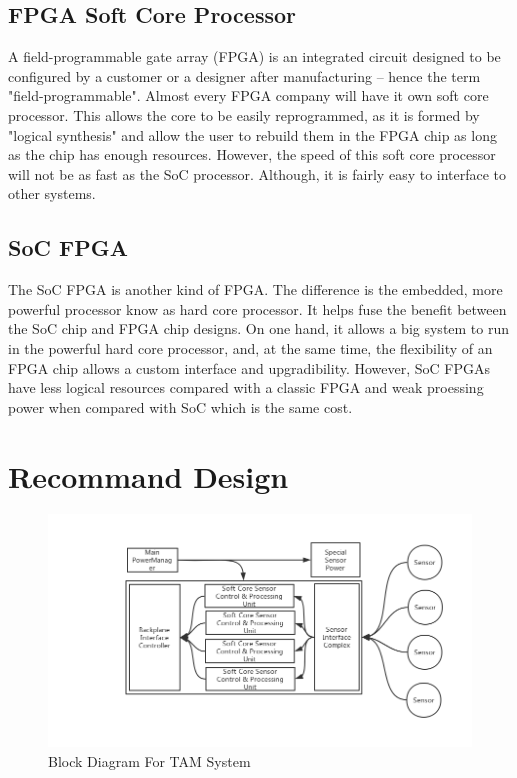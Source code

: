 \documentclass[12pt,article]{memoir}
\begin{document}
\section{FPGA Soft Core Processor}
A field-programmable gate array (FPGA) is an integrated circuit designed to be configured by a customer or a designer after manufacturing – hence the term "field-programmable".\cite{Cite Needed} Almost every FPGA company will have it own soft core processor. This allows the core to be easily reprogrammed, as it is formed by "logical synthesis" and allow the user to rebuild them in the FPGA chip as long as the chip has enough resources. However, the speed of this soft core processor will not be as fast as the SoC processor. Although, it is fairly easy to interface to other systems.\section{SoC FPGA}
The SoC FPGA is another kind of FPGA. The difference is the embedded, more powerful processor know as hard core processor. It helps fuse the benefit between the SoC chip and FPGA chip designs. On one hand, it allows a big system to run in the powerful hard core processor, and, at the same time, the flexibility of an FPGA chip allows a custom interface and upgradibility. However, SoC FPGAs have less logical resources compared with a classic FPGA and weak proessing power when compared with SoC which is the same cost.\newpage
\chapter{Recommand Design}
\begin{figure}[htp]
\begin{center}
\includegraphics[width=\textwidth]{img/DR00004_FPGA.png}
 \caption{Block Diagram For TAM System}	
\end{center}
\end{figure}
\end{document}
